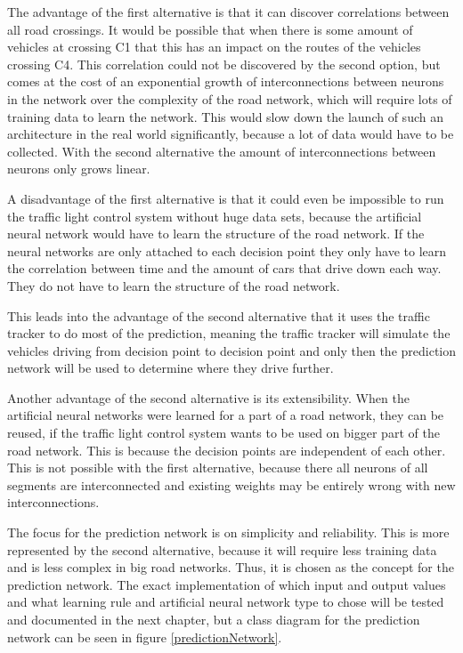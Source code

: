 The advantage of the first alternative is that it can discover correlations between all road crossings. It would be possible that when there is some amount of vehicles at crossing C1 that this has an impact on the routes of the vehicles crossing C4. This correlation could not be discovered by the second option, but comes at the cost of an exponential growth of interconnections between neurons in the network over the complexity of the road network, which will require lots of training data to learn the network. This would slow down the launch of such an architecture in the real world significantly, because a lot of data would have to be collected. With the second alternative the amount of interconnections between neurons only grows linear.

A disadvantage of the first alternative is that it could even be impossible to run the traffic light control system without huge data sets, because the artificial neural network would have to learn the structure of the road network. If the neural networks are only attached to each decision point they only have to learn the correlation between time and the amount of cars that drive down each way. They do not have to learn the structure of the road network.

This leads into the advantage of the second alternative that it uses the traffic tracker to do most of the prediction, meaning the traffic tracker will simulate the vehicles driving from decision point to decision point and only then the prediction network will be used to determine where they drive further.

Another advantage of the second alternative is its extensibility. When the artificial neural networks were learned for a part of a road network, they can be reused, if the traffic light control system wants to be used on bigger part of the road network. This is because the decision points are independent of each other. This is not possible with the first alternative, because there all neurons of all segments are interconnected and existing weights may be entirely wrong with new interconnections.

The focus for the prediction network is on simplicity and reliability. This is more represented by the second alternative, because it will require less training data and is less complex in big road networks. Thus, it is chosen as the concept for the prediction network. The exact implementation of which input and output values and what learning rule and artificial neural network type to chose will be tested and documented in the next chapter, but a class diagram for the prediction network can be seen in figure \ref{predictionNetwork}.


